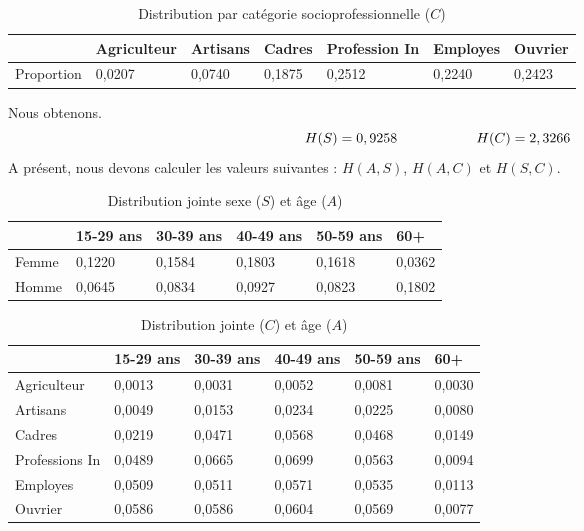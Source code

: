 \documentclass{article}
\begin{document}
\begin{table}[H]
  \centering
  \begin{tabular}{|l|l|l|l|l|l|l|}
  \hline
             & Agriculteur & Artisans & Cadres & Profession In & Employes & Ouvrier \\ \hline
  Proportion & 0,0207      & 0,0740   & 0,1875 & 0,2512        & 0,2240   & 0,2423  \\ \hline
  \end{tabular}
  \caption{Distribution par catégorie socioprofessionnelle ($C$)}
  \end{table}


Nous obtenons.
\[
H(S) = 0,9258  \hspace{2 cm} H(C)= 2,3266
\]
A présent, nous devons calculer les valeurs suivantes : $H(A,S)$, $H(A,C)$ et $H(S,C)$.\\
\begin{table}[H]
  \centering
  \begin{tabular}{|l|l|l|l|l|l|}
  \hline
        & 15-29 ans & 30-39 ans & 40-49 ans & 50-59 ans & 60+    \\ \hline
  Femme & 0,1220    & 0,1584    & 0,1803    & 0,1618    & 0,0362 \\ \hline
  Homme & 0,0645    & 0,0834    & 0,0927    & 0,0823    & 0,1802 \\ \hline
  \end{tabular}
  \caption{Distribution jointe sexe ($S$) et âge ($A$)}
  \end{table}

  \begin{table}[H]
    \centering
    \begin{tabular}{|l|l|l|l|l|l|}
    \hline
                   & 15-29 ans & 30-39 ans & 40-49 ans & 50-59 ans & 60+    \\ \hline
    Agriculteur    & 0,0013    & 0,0031    & 0,0052    & 0,0081    & 0,0030 \\ \hline
    Artisans       & 0,0049    & 0,0153    & 0,0234    & 0,0225    & 0,0080 \\ \hline
    Cadres         & 0,0219    & 0,0471    & 0,0568    & 0,0468    & 0,0149 \\ \hline
    Professions In & 0,0489    & 0,0665    & 0,0699    & 0,0563    & 0,0094 \\ \hline
    Employes       & 0,0509    & 0,0511    & 0,0571    & 0,0535    & 0,0113 \\ \hline
    Ouvrier        & 0,0586    & 0,0586    & 0,0604    & 0,0569    & 0,0077 \\ \hline
    \end{tabular}
    \caption{Distribution jointe ($C$) et âge ($A$)}
    
  \end{table}
\end{document}
